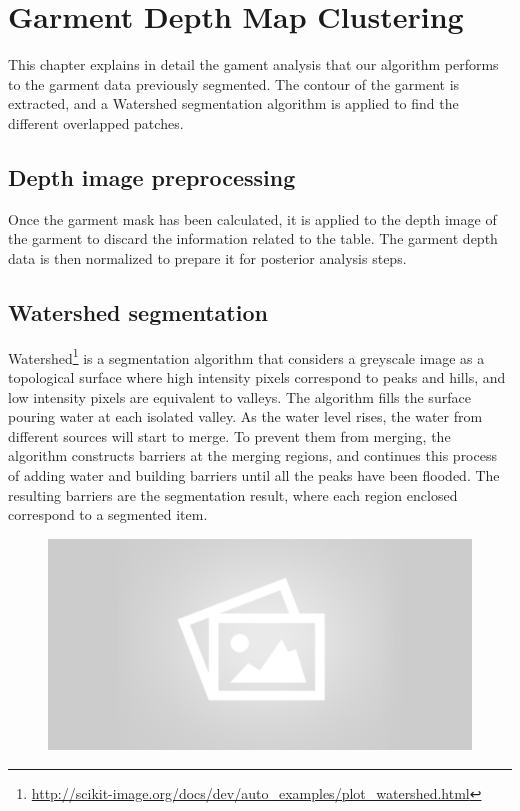 \chapter{Garment Depth Map Clustering}
\label{garment_clustering}

This chapter explains in detail the gament analysis that our algorithm performs to the garment data previously segmented. The contour of the garment is extracted, and a Watershed segmentation algorithm is applied to find the different overlapped patches.

\section{Depth image preprocessing}
\label{depth_image_preprocessing}

Once the garment mask has been calculated, it is applied to the depth image of the garment to discard the information related to the table. The garment depth data is then normalized to prepare it for posterior analysis steps.


\section{Watershed segmentation}

Watershed\footnote{\url{http://scikit-image.org/docs/dev/auto_examples/plot_watershed.html}} is a segmentation algorithm that considers a greyscale image as a topological surface where high intensity pixels correspond to peaks and hills, and low intensity pixels are equivalent to valleys. The algorithm fills the surface pouring water at each isolated valley. As the water level rises, the water from different sources will start to merge. To prevent them from merging, the algorithm constructs barriers at the merging regions, and continues this process of adding water and building barriers until all the peaks have been flooded. The resulting barriers are the segmentation result, where each region enclosed correspond to a segmented item.

\begin{figure}[thpb]
    \centering
    \includegraphics[width=0.7
    \textwidth]{figures/placeholder2.png}
    \caption{}
    \label{fig:watershed_example}
\end{figure}


